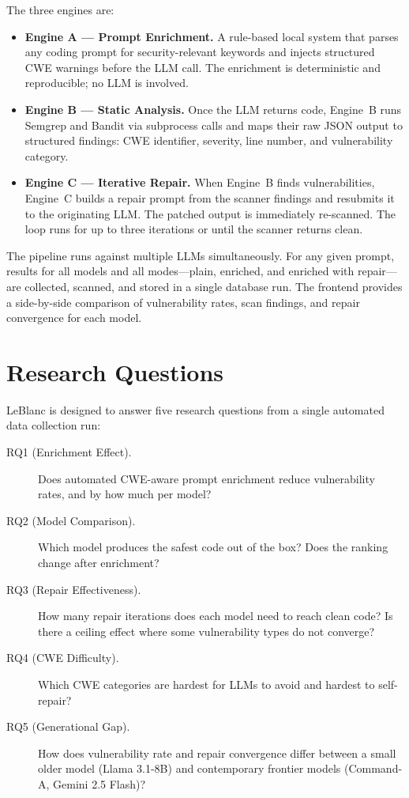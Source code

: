 \documentclass[12pt,a4paper]{report}
\begin{document}
The three engines are:

\begin{itemize}
  \item \textbf{Engine A --- Prompt Enrichment.} A rule-based local system that
        parses any coding prompt for security-relevant keywords and injects
        structured CWE warnings before the LLM call. The enrichment is
        deterministic and reproducible; no LLM is involved.

  \item \textbf{Engine B --- Static Analysis.} Once the LLM returns code,
        Engine~B runs Semgrep and Bandit via subprocess calls and maps their raw
        JSON output to structured findings: CWE identifier, severity, line number,
        and vulnerability category.

  \item \textbf{Engine C --- Iterative Repair.} When Engine~B finds
        vulnerabilities, Engine~C builds a repair prompt from the scanner findings
        and resubmits it to the originating LLM. The patched output is immediately
        re-scanned. The loop runs for up to three iterations or until the scanner
        returns clean.
\end{itemize}

The pipeline runs against multiple LLMs simultaneously. For any given prompt,
results for all models and all modes---plain, enriched, and enriched with
repair---are collected, scanned, and stored in a single database run. The
frontend provides a side-by-side comparison of vulnerability rates, scan
findings, and repair convergence for each model.

\section{Research Questions}
\label{sec:rqs}

LeBlanc is designed to answer five research questions from a single automated
data collection run:

\begin{description}
  \item[RQ1 (Enrichment Effect).] Does automated CWE-aware prompt enrichment
        reduce vulnerability rates, and by how much per model?
  \item[RQ2 (Model Comparison).] Which model produces the safest code out of
        the box? Does the ranking change after enrichment?
  \item[RQ3 (Repair Effectiveness).] How many repair iterations does each model
        need to reach clean code? Is there a ceiling effect where some vulnerability
        types do not converge?
  \item[RQ4 (CWE Difficulty).] Which CWE categories are hardest for LLMs to
        avoid and hardest to self-repair?
  \item[RQ5 (Generational Gap).] How does vulnerability rate and repair
        convergence differ between a small older model (Llama 3.1-8B) and
        contemporary frontier models (Command-A, Gemini 2.5 Flash)?
\end{description}
\end{document}
